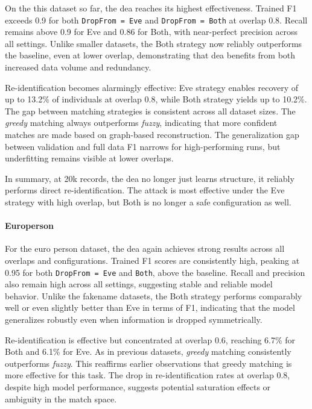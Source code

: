 On the this dataset so far, the \ac{dea} reaches its highest effectiveness.
Trained F1 exceeds 0.9 for both \texttt{DropFrom = Eve} and \texttt{DropFrom = Both} at overlap 0.8.
Recall remains above 0.9 for Eve and 0.86 for Both, with near-perfect precision across all settings.
Unlike smaller datasets, the Both strategy now reliably outperforms the baseline, even at lower overlap, demonstrating that \ac{dea} benefits from both increased data volume and redundancy.

Re-identification becomes alarmingly effective: Eve strategy enables recovery of up to 13.2\% of individuals at overlap 0.8, while Both strategy yields up to 10.2\%.
The gap between matching strategies is consistent across all dataset sizes.
The \emph{greedy} matching always outperforms \emph{fuzzy}, indicating that more confident matches are made based on graph-based reconstruction.
The generalization gap between validation and full data F1 narrows for high-performing runs, but underfitting remains visible at lower overlaps.

In summary, at 20k records, the \ac{dea} no longer just learns structure, it reliably performs direct re-identification.
The attack is most effective under the Eve strategy with high overlap, but Both is no longer a safe configuration as well.

\paragraph{Europerson}

For the euro person dataset, the \ac{dea} again achieves strong results across all overlaps and configurations.
Trained F1 scores are consistently high, peaking at 0.95 for both \texttt{DropFrom = Eve} and \texttt{Both}, above the baseline.
Recall and precision also remain high across all settings, suggesting stable and reliable model behavior.
Unlike the fakename datasets, the Both strategy performs comparably well or even slightly better than Eve in terms of F1, indicating that the model generalizes robustly even when information is dropped symmetrically.

Re-identification is effective but concentrated at overlap 0.6, reaching 6.7\% for Both and 6.1\% for Eve.
As in previous datasets, \emph{greedy} matching consistently outperforms \emph{fuzzy}.
This reaffirms earlier observations that greedy matching is more effective for this task.
The drop in re-identification rates at overlap 0.8, despite high model performance, suggests potential saturation effects or ambiguity in the match space.

